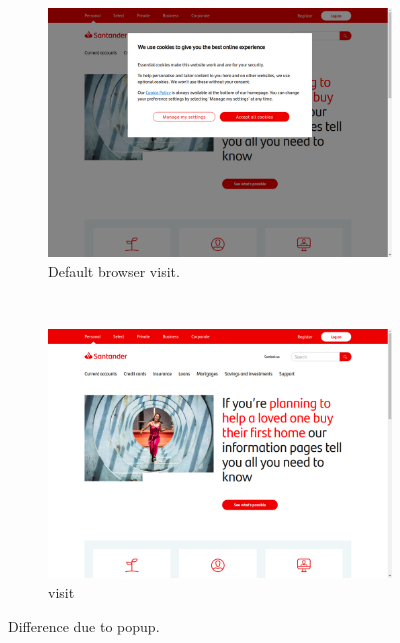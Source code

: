 \begin{figure}[t]
    \centering
    \begin{subfigure}{0.48\linewidth}
        \centering
            \includegraphics[width=\textwidth]{figs/2306_normal.png}%
        \caption{Default browser visit.}
        \label{fig:2306_normal}
    \end{subfigure}
    ~
    \begin{subfigure}{0.48\linewidth}
        \centering
            \includegraphics[width=\textwidth]{figs/2306_sp.png}
        \caption{\spartacus visit}
        \label{fig:2306_sp}
    \end{subfigure}
    
    \caption{Difference due to popup.}
    \label{fig:2306}
\end{figure}

